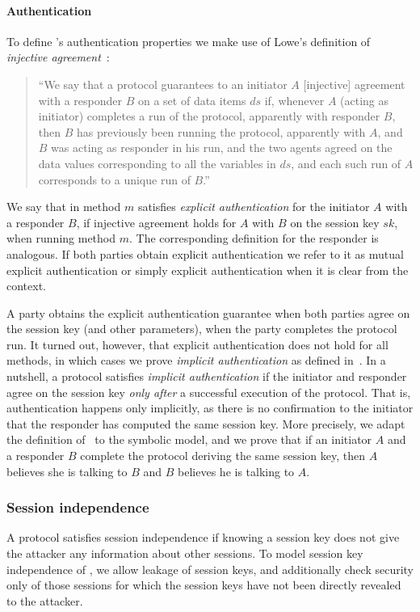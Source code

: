 \paragraph{Authentication}
To define \mEdhoc{}'s authentication properties we make use of Lowe's definition
of \emph{injective agreement}~\cite{DBLP:conf/csfw/Lowe97a}:
\begin{quote}
  ``We say that a protocol guarantees to an initiator $A$ [injective] agreement
  with a responder $B$ on a set of data items $ds$ if, whenever $A$ (acting as
  initiator) completes a run of the protocol, apparently with responder $B$,
  then $B$ has previously been running the protocol, apparently with $A$, and
  $B$ was acting as responder in his run, and the two agents agreed on the data
  values corresponding to all the variables in $ds$, and each such run of $A$
  corresponds to a unique run of $B$.''
\end{quote}
%
We say that \mEdhoc{} in method $m$ satisfies \emph{explicit authentication} for
the initiator $A$ with a responder $B$, if injective agreement holds for $A$
with $B$ on the session key $sk$, when running method $m$.
%
The corresponding definition for the responder is analogous.
%
If both parties obtain explicit authentication we refer to it as mutual explicit
authentication or simply explicit authentication when it is clear from the
context.

A party obtains the explicit authentication guarantee when both parties agree
on the session key (and other parameters), when the party completes the protocol
run.
%
It turned out, however, that explicit authentication does not hold for all
\mEdhoc{} methods, in which cases we prove \emph{implicit authentication} as
defined in~\cite{DBLP:journals/iacr/GuilhemFW19}.
%
In a nutshell, a protocol satisfies \emph{implicit authentication} if the
initiator and responder agree on the session key \emph{only after} a successful
execution of the protocol.
%
That is, authentication happens only implicitly, as there is no confirmation to
the initiator that the responder has computed the same session key.
%
More precisely, we adapt the definition of~\cite{DBLP:journals/iacr/GuilhemFW19}
to the symbolic model, and we prove that if an initiator $A$ and a responder $B$
complete the protocol deriving the same session key, then $A$ believes she is
talking to $B$ and $B$ believes he is talking to $A$.

\subsubsection{Session independence}
A protocol satisfies session independence if knowing a session key does
not give the attacker any information about other sessions.  To model session
key independence of \mEdhoc, we allow leakage of session keys, and additionally
check security only of those sessions for which the session keys have not been
directly revealed to the attacker.

